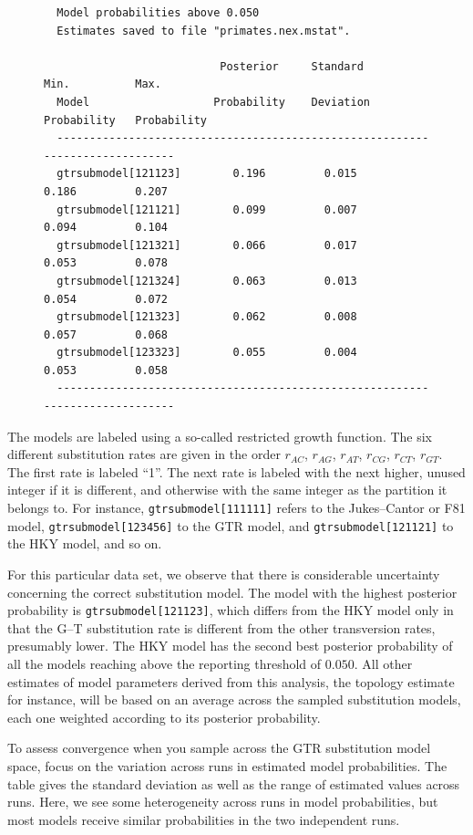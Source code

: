 \documentclass[12pt]{book}
\begin{document}
\begin{figure}[h]\singlespacing\footnotesize
\begin{verbatim}
  Model probabilities above 0.050
  Estimates saved to file "primates.nex.mstat".

                           Posterior     Standard        Min.          Max.   
  Model                   Probability    Deviation    Probability   Probability
  -----------------------------------------------------------------------------
  gtrsubmodel[121123]        0.196         0.015         0.186         0.207
  gtrsubmodel[121121]        0.099         0.007         0.094         0.104
  gtrsubmodel[121321]        0.066         0.017         0.053         0.078
  gtrsubmodel[121324]        0.063         0.013         0.054         0.072
  gtrsubmodel[121323]        0.062         0.008         0.057         0.068
  gtrsubmodel[123323]        0.055         0.004         0.053         0.058
  -----------------------------------------------------------------------------
\end{verbatim}\end{figure}

The models are labeled using a so-called restricted growth function. The six different substitution
rates are given in the order $r_{AC}$, $r_{AG}$, $r_{AT}$, $r_{CG}$, $r_{CT}$, $r_{GT}$. The first rate is
labeled ``1''. The next rate is labeled with the next higher, unused integer if it is different,
and otherwise with the same integer as the partition it belongs to. For instance,
\texttt{gtrsubmodel[111111]} refers to the Jukes--Cantor or F81 model, \texttt{gtrsubmodel[123456]} to
the GTR model, and \texttt{gtrsubmodel[121121]} to the HKY model, and so on.

For this particular data set, we observe that there is considerable uncertainty concerning the
correct substitution model. The model with the highest posterior probability is
\texttt{gtrsubmodel[121123]}, which differs from the HKY model only in that the G--T substitution rate
is different from the other transversion rates, presumably lower. The HKY model has the second best
posterior probability of all the models reaching above the reporting threshold of $0.050$. All other
estimates of model parameters derived from this analysis, the topology estimate for instance, will
be based on an average across the sampled substitution models, each one weighted according to its
posterior probability.

To assess convergence when you sample across the GTR substitution model space, focus on the
variation across runs in estimated model probabilities. The table gives the standard deviation as
well as the range of estimated values across runs. Here, we see some heterogeneity across runs in
model probabilities, but most models receive similar probabilities in the two independent runs.
\end{document}
